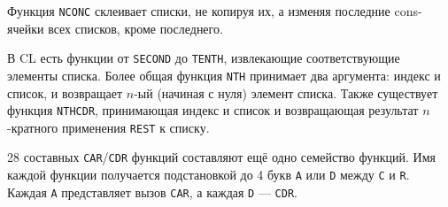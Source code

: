 Функция \lstinline{NCONC} склеивает списки, не копируя их, а изменяя последние cons-ячейки всех списков, кроме последнего.

В CL есть функции от \lstinline{SECOND} до \lstinline{TENTH}, извлекающие соответствующие элементы списка. Более общая функция \lstinline{NTH} принимает два аргумента: индекс и список, и возвращает $n$-ый (начиная с нуля) элемент списка. Также существует функция \lstinline{NTHCDR}, принимающая индекс и список и возвращающая результат $n$-кратного применения \lstinline{REST} к списку.

28 составных \lstinline{CAR}/\lstinline{CDR} функций составляют ещё одно семейство функций. Имя каждой функции получается подстановкой до 4 букв \lstinline{A} или \lstinline{D} между \lstinline{C} и \lstinline{R}. Каждая \lstinline{A} представляет вызов \lstinline{CAR}, а каждая \lstinline{D} — \lstinline{CDR}.

